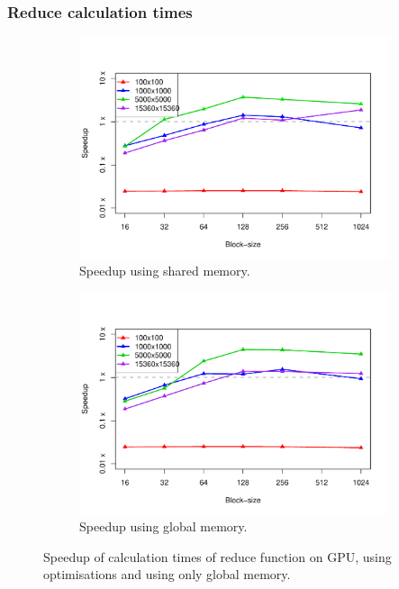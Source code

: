 \documentclass[12pt]{article}
\begin{document}
\subsubsection*{Reduce calculation times}
\begin{figure}
	\centering
	\begin{subfigure}{0.48\linewidth}
		\centering
		\includegraphics[width=0.85\linewidth]{../plots/redcalc_shared.pdf}
		\caption{Speedup using shared memory.}
		\label{fig:4}
	\end{subfigure}\hfill
	\begin{subfigure}{0.48\linewidth}
		\centering
		\includegraphics[width=0.85\linewidth]{../plots/redcalc_glob.pdf}
		\caption{Speedup using global memory.}
		\label{fig:5}
	\end{subfigure}
	\caption{Speedup of calculation times of reduce function on GPU, using optimisations and using only global memory.}
\end{figure}
\end{document}
